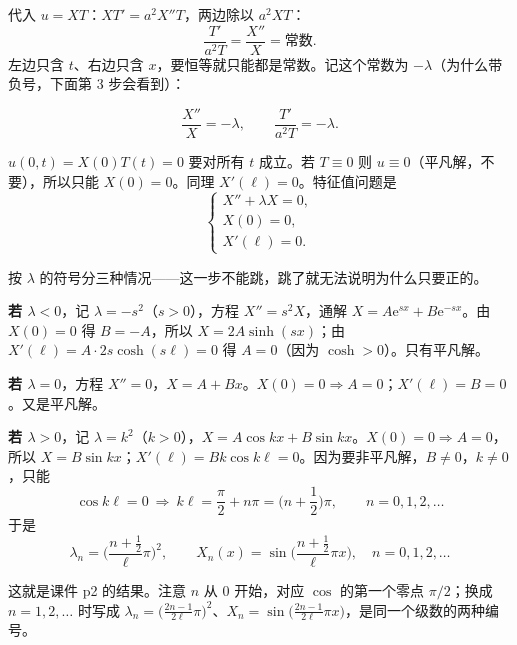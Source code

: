 \documentclass[11pt]{ctexart}
\begin{document}
代入 $u=XT$：$X T'=a^2X''T$，两边除以 $a^2XT$：
\begin{equation}
  \frac{T'}{a^2T}=\frac{X''}{X}=\text{常数}.
\end{equation}
左边只含 $t$、右边只含 $x$，要恒等就只能都是常数。记这个常数为 $-\lambda$（为什么带负号，下面第 3 步会看到）：

\begin{equation}
  \frac{X''}{X}=-\lambda,\qquad \frac{T'}{a^2T}=-\lambda .
\end{equation}

$u(0,t)=X(0)T(t)=0$ 要对所有 $t$ 成立。若 $T\equiv0$ 则 $u\equiv0$（平凡解，不要），所以只能 $X(0)=0$。同理 $X'(\ell)=0$。特征值问题是
\begin{equation}
  \begin{cases}
    X''+\lambda X=0,\\
    X(0)=0,\\
    X'(\ell)=0 .
  \end{cases}
\end{equation}

按 $\lambda$ 的符号分三种情况——这一步不能跳，跳了就无法说明为什么只要正的。

\textbf{若 $\lambda<0$}，记 $\lambda=-s^2$（$s>0$），方程 $X''=s^2X$，通解 $X=A\mathrm e^{sx}+B\mathrm e^{-sx}$。由 $X(0)=0$ 得 $B=-A$，所以 $X=2A\sinh(sx)$；由 $X'(\ell)=A\cdot2s\cosh(s\ell)=0$ 得 $A=0$（因为 $\cosh>0$）。只有平凡解。

\textbf{若 $\lambda=0$}，方程 $X''=0$，$X=A+Bx$。$X(0)=0\Rightarrow A=0$；$X'(\ell)=B=0$。又是平凡解。

\textbf{若 $\lambda>0$}，记 $\lambda=k^2$（$k>0$），$X=A\cos kx+B\sin kx$。$X(0)=0\Rightarrow A=0$，所以 $X=B\sin kx$；$X'(\ell)=Bk\cos k\ell=0$。因为要非平凡解，$B\neq0$，$k\neq0$，只能
\begin{equation}
  \cos k\ell=0\ \Longrightarrow\ k\ell=\frac{\pi}{2}+n\pi=\Big(n+\frac12\Big)\pi,\qquad n=0,1,2,\dots
\end{equation}
于是
\begin{equation}
  \boxed{\;\lambda_n=\Big(\frac{n+\frac12}{\ell}\pi\Big)^2,\qquad
  X_n(x)=\sin\Big(\frac{n+\frac12}{\ell}\pi x\Big),\quad n=0,1,2,\dots\;}
\end{equation}

这就是课件 p2 的结果。注意 $n$ 从 $0$ 开始，对应 $\cos$ 的第一个零点 $\pi/2$；换成 $n=1,2,\dots$ 时写成 $\lambda_n=\big(\frac{2n-1}{2\ell}\pi\big)^2$、$X_n=\sin\big(\frac{2n-1}{2\ell}\pi x\big)$，是同一个级数的两种编号。
\end{document}
